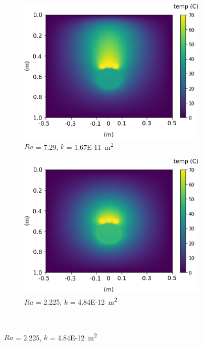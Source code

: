 \documentclass[Journal,letterpaper,InsideFigs]{ascelike-new}
\begin{document}
\begin{figure}
\begin{subfigure}[b]{0.49\textwidth}
    \includegraphics[width=\textwidth]{figs/ra/7.png}
    \caption{$Ra$ = 7.29, $k$ = \SI{1.67E-11}{\meter\squared}}
 \end{subfigure}
 \begin{subfigure}[b]{0.49\textwidth}
    \includegraphics[width=\textwidth]{figs/ra/2.png}
    \caption{$Ra$ = 2.225, $k$ = \SI{4.84E-12}{\meter\squared}}
 \end{subfigure}\\  
\end{figure}%
\end{document}
